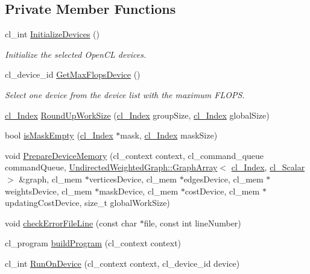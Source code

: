 \subsection*{Private Member Functions}
\begin{DoxyCompactItemize}
\item 
cl\+\_\+int \hyperlink{class_dijkstra_1_1_dijkstra_c_l_a5e54d3932bccd4bf984df2098b125898}{Initialize\+Devices} ()
\begin{DoxyCompactList}\small\item\em Initialize the selected Open\+C\+L devices. \end{DoxyCompactList}\item 
cl\+\_\+device\+\_\+id \hyperlink{class_dijkstra_1_1_dijkstra_c_l_a6bfc38ebf6e1d303f908ac254f94df41}{Get\+Max\+Flops\+Device} ()
\begin{DoxyCompactList}\small\item\em Select one device from the device list with the maximum F\+L\+O\+P\+S. \end{DoxyCompactList}\item 
\hyperlink{class_dijkstra_1_1_dijkstra_c_l_aab92585b062690f0835f154dc28f8c04}{cl\+\_\+\+Index} \hyperlink{class_dijkstra_1_1_dijkstra_c_l_afdc37522923aee23fe315bcf8d992275}{Round\+Up\+Work\+Size} (\hyperlink{class_dijkstra_1_1_dijkstra_c_l_aab92585b062690f0835f154dc28f8c04}{cl\+\_\+\+Index} group\+Size, \hyperlink{class_dijkstra_1_1_dijkstra_c_l_aab92585b062690f0835f154dc28f8c04}{cl\+\_\+\+Index} global\+Size)
\item 
bool \hyperlink{class_dijkstra_1_1_dijkstra_c_l_a2d58915ccd8fa4967947598a4a588d40}{is\+Mask\+Empty} (\hyperlink{class_dijkstra_1_1_dijkstra_c_l_aab92585b062690f0835f154dc28f8c04}{cl\+\_\+\+Index} $\ast$mask, \hyperlink{class_dijkstra_1_1_dijkstra_c_l_aab92585b062690f0835f154dc28f8c04}{cl\+\_\+\+Index} mask\+Size)
\item 
void \hyperlink{class_dijkstra_1_1_dijkstra_c_l_acd0c8413f67d7bc40994585c59534400}{Prepare\+Device\+Memory} (cl\+\_\+context context, cl\+\_\+command\+\_\+queue command\+Queue, \hyperlink{struct_undirected_weighted_graph_1_1_graph_array}{Undirected\+Weighted\+Graph\+::\+Graph\+Array}$<$ \hyperlink{class_dijkstra_1_1_dijkstra_c_l_aab92585b062690f0835f154dc28f8c04}{cl\+\_\+\+Index}, \hyperlink{class_dijkstra_1_1_dijkstra_c_l_a5dc96724577a49ee14d4c2e1df3c0579}{cl\+\_\+\+Scalar} $>$ \&graph, cl\+\_\+mem $\ast$vertices\+Device, cl\+\_\+mem $\ast$edges\+Device, cl\+\_\+mem $\ast$weights\+Device, cl\+\_\+mem $\ast$mask\+Device, cl\+\_\+mem $\ast$cost\+Device, cl\+\_\+mem $\ast$updating\+Cost\+Device, size\+\_\+t global\+Work\+Size)
\item 
void \hyperlink{class_dijkstra_1_1_dijkstra_c_l_a8fb0b75503b75bb345ed69f3eb67db0c}{check\+Error\+File\+Line} (const char $\ast$file, const int line\+Number)
\item 
cl\+\_\+program \hyperlink{class_dijkstra_1_1_dijkstra_c_l_adba3c2be1500db0f3be3da2933dff8f7}{build\+Program} (cl\+\_\+context context)
\item 
cl\+\_\+int \hyperlink{class_dijkstra_1_1_dijkstra_c_l_a441934a4066c0f99962c96aded098536}{Run\+On\+Device} (cl\+\_\+context context, cl\+\_\+device\+\_\+id device)
\end{DoxyCompactItemize}
